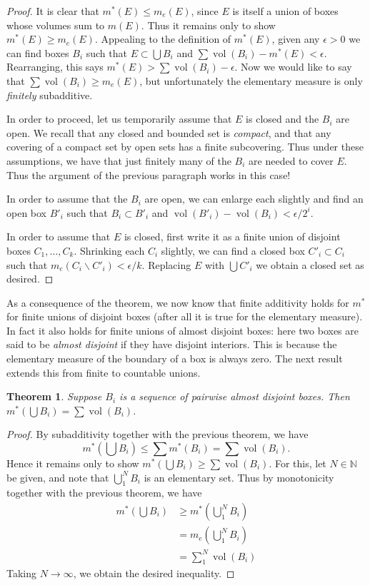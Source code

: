 \documentclass[10pt,oneside]{amsbook}
\renewcommand{\setminus}{\smallsetminus}
\newcommand{\NN}{{\mathbb N}}
\DeclareMathOperator{\vol}{vol}
\theoremstyle{definition}
\theoremstyle{plain}
\newtheorem{thm}{Theorem}[section]
\theoremstyle{definition}
\theoremstyle{remark}
\numberwithin{equation}{section}
\numberwithin{figure}{section}
\begin{document}
\begin{proof}
  It is clear that $m^*(E)\leq m_e(E)$, since $E$ is itself a union of boxes whose volumes sum to $m(E)$. Thus it remains only to show $m^*(E)\geq m_e(E)$. Appealing to the definition of $m^*(E)$, given any $\epsilon>0$ we can find boxes $B_i$ such that $E\subset\bigcup B_i$ and $\sum\vol(B_i)-m^*(E)<\epsilon$. Rearranging, this says $m^*(E)>\sum\vol(B_i)-\epsilon$. Now we would like to say that $\sum\vol(B_i)\geq m_e(E)$, but unfortunately the elementary measure is only \emph{finitely} subadditive.

  In order to proceed, let us temporarily assume that $E$ is closed and the $B_i$ are open. We recall that any closed and bounded set is \emph{compact}, and that any covering of a compact set by open sets has a finite subcovering. Thus under these assumptions, we have that just finitely many of the $B_i$ are needed to cover $E$. Thus the argument of the previous paragraph works in this case!

  In order to assume that the $B_i$ are open, we can enlarge each slightly and find an open box $B'_i$ such that $B_i\subset B'_i$ and $\vol(B'_i)-\vol(B_i)<\epsilon/2^i$.

  In order to assume that $E$ is closed, first write it as a finite union of disjoint boxes $C_1,\ldots,C_k$. Shrinking each $C_i$ slightly, we can find a closed box $C'_i\subset C_i$ such that $m_e(C_i\setminus C'_i)<\epsilon/k$. Replacing $E$ with $\bigcup C'_i$ we obtain a closed set as desired.
\end{proof}

As a consequence of the theorem, we now know that finite additivity holds for $m^*$ for finite unions of disjoint boxes (after all it is true for the elementary measure). In fact it also holds for finite unions of almost disjoint boxes: here two boxes are said to be \emph{almost disjoint} if they have disjoint interiors. This is because the elementary measure of the boundary of a box is always zero. The next result extends this from finite to countable unions.

\begin{thm}
  Suppose $B_i$ is a sequence of pairwise almost disjoint boxes. Then $m^*(\bigcup B_i)=\sum\vol(B_i)$.
\end{thm}

\begin{proof}
  By subadditivity together with the previous theorem, we have 
  \[ m^*(\bigcup B_i)\leq\sum m^*(B_i)=\sum\vol(B_i). \]
  Hence it remains only to show $m^*(\bigcup B_i)\geq\sum\vol(B_i)$. For this, let $N\in\NN$ be given, and note that $\bigcup_1^NB_i$ is an elementary set. Thus by monotonicity together with the previous theorem, we have
  \begin{align*}
    m^*(\bigcup B_i)&\geq m^*(\bigcup_1^NB_i)\\
                    &=m_e(\bigcup_1^NB_i)\\
                    &=\sum_1^N\vol(B_i)
  \end{align*}
  Taking $N\to\infty$, we obtain the desired inequality.
\end{proof}
\end{document}
